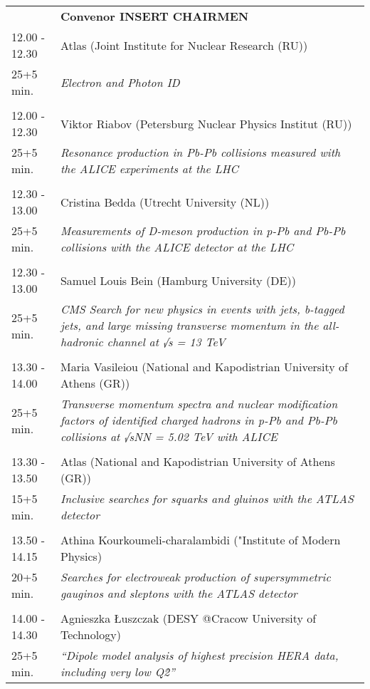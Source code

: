 \begin{longtable}{p{3cm}p{13cm}}
&\hfill {\bf Convenor INSERT CHAIRMEN }\\ 
12.00 - 12.30 & Atlas (Joint Institute for  Nuclear Research (RU))\\ 
25+5 min. & {\it Electron and Photon ID}\\ 
 & \\ 
12.00 - 12.30 & Viktor Riabov (Petersburg Nuclear Physics Institut (RU))\\ 
25+5 min. & {\it Resonance production in Pb-Pb collisions measured with the ALICE experiments at the LHC}\\ 
 & \\ 
12.30 - 13.00 & Cristina Bedda (Utrecht University (NL))\\ 
25+5 min. & {\it Measurements of D-meson production in p-Pb and Pb-Pb collisions with the ALICE detector at the LHC}\\ 
 & \\ 
12.30 - 13.00 & Samuel Louis Bein (Hamburg University (DE))\\ 
25+5 min. & {\it CMS Search for new physics in events with jets, b-tagged jets, and large missing transverse momentum in the all-hadronic channel at √s = 13 TeV}\\ 
 & \\ 
13.30 - 14.00 & Maria Vasileiou (National and Kapodistrian University of Athens (GR))\\ 
25+5 min. & {\it Transverse momentum spectra and nuclear modification factors of identified charged hadrons in p-Pb and Pb-Pb collisions at √sNN  = 5.02 TeV with ALICE}\\ 
 & \\ 
13.30 - 13.50 & Atlas (National and Kapodistrian University of Athens (GR))\\ 
15+5 min. & {\it Inclusive searches for squarks and gluinos with the ATLAS detector}\\ 
 & \\ 
13.50 - 14.15 & Athina Kourkoumeli-charalambidi ("Institute of Modern Physics)\\ 
20+5 min. & {\it Searches for electroweak production of supersymmetric gauginos and sleptons with the ATLAS detector}\\ 
 & \\ 
14.00 - 14.30 & Agnieszka Łuszczak (DESY @Cracow University of Technology)\\ 
25+5 min. & {\it “Dipole model analysis of highest precision HERA data, including very low Q\^2”}\\ 

\end{longtable}
